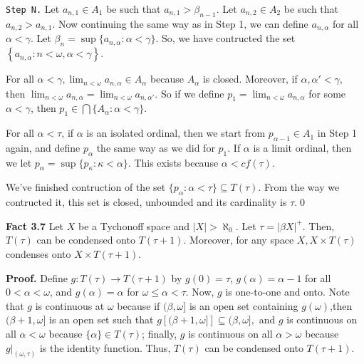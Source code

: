 \documentclass{article}
\begin{document}
\vskip 10pt

\texttt{Step N.}
Let $a_{n,1}\in A_1$ be such that $a_{n,1} > \beta_{n-1}$. Let $a_{n,2}\in A_2$ be such that $a_{n,2} > a_{n,1}$. Now continuing the same way as in Step 1, we can define $a_{n,\alpha}$ for all $\alpha<\gamma$. Let $\beta_n=\sup\{a_{n,\alpha}: \alpha <\gamma\}$. 
\vskip 10pt
So, we have contructed the set $\left\{a_{n,\alpha}: n<\omega, \alpha<\gamma\right\}$.

\vskip 10pt

For all $\alpha<\gamma, \lim_{n<\omega} a_{n,\alpha} \in A_\alpha$ because $A_\alpha$ is closed. Moreover, if $\alpha,\alpha' <\gamma$, then $\lim_{n<\omega} a_{n,\alpha}= \lim_{n<\omega} a_{n,\alpha'}$. So if we define $p_1=\lim_{n<\omega} a_{n,\alpha}$ for some $\alpha<\gamma$, then $p_1\in \bigcap \{A_\alpha: \alpha<\gamma\}$. 
\vskip 10pt


For all $\alpha <\tau$, if $\alpha$ is an isolated ordinal, then we start from $p_{\alpha-1}\in A_1$ in Step 1 again, and define $p_\alpha$ the same way as we did for $p_1$. 
If $\alpha$ is a limit ordinal, then we let $p_\alpha= \sup \{p_\kappa: \kappa<\alpha\}$. This exists because $\alpha<cf(\tau)$. 

\vskip 10pt

We've finished contruction of the set $\{p_\alpha: \alpha<\tau\}\subseteq T(\tau)$.  From the way we contructed it, this set is closed, unbounded and its cardinality is $\tau$.\qed


\vskip 30pt

\textbf{Fact 3.7} Let $X$ be a Tychonoff space and $|X|>\aleph_0$. Let $\tau=|\beta X|^+$. Then, $T(\tau)$ can be condensed onto $T(\tau+1).$ Moreover, for any space $X, X\times T(\tau)$ condenses onto $X\times T(\tau+1).$

\vskip 15pt

\textbf{Proof.} Define $g:T(\tau) \rightarrow T(\tau+1)$ by $g(0)=\tau$, $g(\alpha)=\alpha-1$ for all $0<\alpha<\omega$, and $g(\alpha)=\alpha$ for $\omega\leq \alpha <\tau$. Now, $g$ is one-to-one and onto. Note that $g$ is continuous at $\omega$ because if $(\beta, \omega]$ is an open set containing $g(\omega)$,then $(\beta+1,\omega]$ is an open set such that $g\left[(\beta+1, \omega]\right] \subseteq (\beta, \omega],$ and $g$ is continuous on all $\alpha<\omega$ because $\{\alpha\} \in T(\tau)$; finally, $g$ is continuous on all $\alpha>\omega$ because $g|_{(\omega, \tau)}$ is the identity function. Thus, $T(\tau)$ can be condensed onto $T(\tau+1).$
\end{document}
